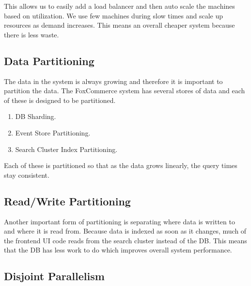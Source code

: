 \documentclass[11pt]{article}
\begin{document}
This allows us to easily add a load balancer and then auto scale the machines based
on utilization. We use few machines during slow times and scale up resources
as demand increases. This means an overall cheaper system because there is less waste.


\subsection{Data Partitioning}

The data in the system is always growing and therefore it is important to partition
the data. The FoxCommerce system has several stores of data and each of these 
is designed to be partitioned.

\begin{enumerate}
    \item DB Sharding.
    \item Event Store Partitioning.
    \item Search Cluster Index Partitioning.
\end{enumerate}

Each of these is partitioned so that as the data grows linearly, the query 
times stay consistent.

\subsection{Read/Write Partitioning}

Another important form of partitioning is separating where data is written to and
where it is read from. Because data is indexed as soon as it changes, much of the frontend UI code 
reads from the search cluster instead of the DB. This means that the DB has less
work to do which improves overall system performance.

\subsection{Disjoint Parallelism}
\end{document}
